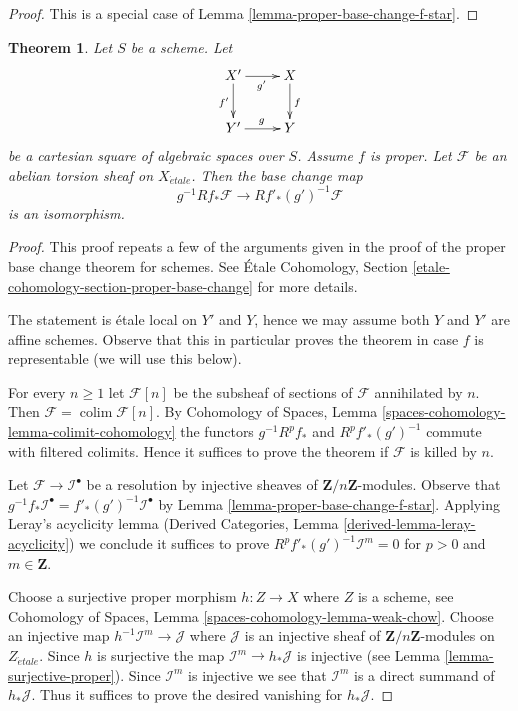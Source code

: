 \documentclass{stacks-project}
\theoremstyle{plain}
\newtheorem{theorem}[subsection]{Theorem}
\theoremstyle{definition}
\theoremstyle{remark}
\numberwithin{equation}{subsection}
\def\colim{\mathop{\mathrm{colim}}\nolimits}
\def\etale{{\acute{e}tale}}
\begin{document}
\begin{proof}
This is a special case of Lemma \ref{lemma-proper-base-change-f-star}.
\end{proof}

\begin{theorem}
\label{theorem-proper-base-change}
Let $S$ be a scheme. Let
$$
\xymatrix{
X' \ar[r]_{g'} \ar[d]_{f'} & X \ar[d]^f \\
Y' \ar[r]^g & Y
}
$$
be a cartesian square of algebraic spaces over $S$.
Assume $f$ is proper.
Let $\mathcal{F}$ be an abelian torsion sheaf on $X_\etale$.
Then the base change map
$$
g^{-1}Rf_*\mathcal{F} \longrightarrow Rf'_*(g')^{-1}\mathcal{F}
$$
is an isomorphism.
\end{theorem}

\begin{proof}
This proof repeats a few of the arguments given in the proof of the
proper base change theorem for schemes. See
\'Etale Cohomology, Section \ref{etale-cohomology-section-proper-base-change}
for more details.

\medskip\noindent
The statement is \'etale local on $Y'$ and $Y$, hence we may assume
both $Y$ and $Y'$ are affine schemes. Observe that this in particular
proves the theorem in case $f$ is representable (we will use this
below).

\medskip\noindent
For every $n \geq 1$ let $\mathcal{F}[n]$ be the subsheaf of sections
of $\mathcal{F}$ annihilated by $n$. Then
$\mathcal{F} = \colim \mathcal{F}[n]$. By 
Cohomology of Spaces, Lemma \ref{spaces-cohomology-lemma-colimit-cohomology}
the functors $g^{-1}R^pf_*$ and $R^pf'_*(g')^{-1}$ commute
with filtered colimits. Hence it suffices to prove the theorem
if $\mathcal{F}$ is killed by $n$.

\medskip\noindent
Let $\mathcal{F} \to \mathcal{I}^\bullet$ be a resolution by
injective sheaves of $\mathbf{Z}/n\mathbf{Z}$-modules.
Observe that
$g^{-1}f_*\mathcal{I}^\bullet = f'_*(g')^{-1}\mathcal{I}^\bullet$
by Lemma \ref{lemma-proper-base-change-f-star}.
Applying Leray's acyclicity lemma
(Derived Categories, Lemma \ref{derived-lemma-leray-acyclicity})
we conclude it suffices to prove
$R^pf'_*(g')^{-1}\mathcal{I}^m = 0$ for $p > 0$ and $m \in \mathbf{Z}$.

\medskip\noindent
Choose a surjective proper morphism
$h : Z \to X$ where $Z$ is a scheme, see
Cohomology of Spaces, Lemma \ref{spaces-cohomology-lemma-weak-chow}.
Choose an injective map $h^{-1}\mathcal{I}^m \to \mathcal{J}$
where $\mathcal{J}$ is an injective sheaf of
$\mathbf{Z}/n\mathbf{Z}$-modules on $Z_\etale$.
Since $h$ is surjective the map $\mathcal{I}^m \to h_*\mathcal{J}$
is injective (see Lemma \ref{lemma-surjective-proper}).
Since $\mathcal{I}^m$ is injective we see that $\mathcal{I}^m$
is a direct summand of $h_*\mathcal{J}$. Thus it suffices
to prove the desired vanishing for $h_*\mathcal{J}$.


\end{proof}
\end{document}

